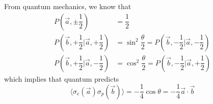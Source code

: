 \documentclass[aps,prb,onecolumn,notitlepage,showpacs,floatfix,superscriptaddress]{revtex4-1}
\begin{document}
From quantum mechanics, we know that 
\begin{equation}
\begin{split}
P\left(\vec{a},\pm \dfrac{1}{2}\right) &= \dfrac{1}{2} \\
P\left(\vec{b},+\dfrac{1}{2} \bigg\vert \vec{a},+\dfrac{1}{2}\right) &= \sin^2\dfrac{\theta}{2} = P\left(\vec{b},-\dfrac{1}{2} \bigg\vert \vec{a},-\dfrac{1}{2}\right) \\
P\left(\vec{b},+\dfrac{1}{2} \bigg\vert \vec{a},-\dfrac{1}{2}\right) &= \cos^2\dfrac{\theta}{2} = P\left(\vec{b},-\dfrac{1}{2} \bigg\vert \vec{a},+\dfrac{1}{2}\right)
\end{split}
\end{equation}
which implies that quantum predicts 
\begin{equation}
\langle \sigma_e(\vec{a}) \sigma_p(\vec{b}) \rangle = -\dfrac{1}{4} \cos\theta = -\dfrac{1}{4} \vec{a} \cdot \vec{b}
\end{equation}
\end{document}
